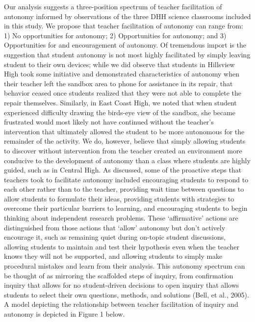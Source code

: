 \documentclass[11.5pt]{sig-alternate} %
\begin{document}
\begin{large}
Our analysis suggests a three-position spectrum of teacher facilitation of autonomy informed by observations of the three DHH science classrooms included in this study.  We propose that teacher facilitation of autonomy can range from:  1) No opportunities for autonomy; 2) Opportunities for autonomy; and 3) Opportunities for and encouragement of autonomy.   Of tremendous import is the suggestion that student autonomy is not most highly facilitated by simply leaving student to their own devices; while we did observe that students in Hillsview High took some initiative and demonstrated characteristics of autonomy when their teacher left the sandbox area to phone for assistance in its repair, that behavior ceased once students realized that they were not able to complete the repair themselves.  Similarly, in East Coast High, we noted that when student experienced difficulty drawing the birds-eye view of the sandbox, she became frustrated would most likely not have continued without the teacher’s intervention that ultimately allowed the student to be more autonomous for the remainder of the activity.  We do, however, believe that simply allowing students to discover without intervention from the teacher created an environment more conducive to the development of autonomy than a class where students are highly guided, such as in Central High.  As discussed, some of the proactive steps that teachers took to facilitate autonomy included encouraging students to respond to each other rather than to the teacher, providing wait time between questions to allow students to formulate their ideas, providing students with strategies to overcome their particular barriers to learning, and encouraging students to begin thinking about independent research problems.  These ‘affirmative’ actions are distinguished from those actions that ‘allow’ autonomy but don’t actively encourage it, such as remaining quiet during on-topic student discussions, allowing students to maintain and test their hypothesis even when the teacher knows they will not be supported, and allowing students to simply make procedural mistakes and learn from their analysis.  This autonomy spectrum can be thought of as mirroring the scaffolded steps of inquiry, from confirmation inquiry that allows for no student-driven decisions to open inquiry that allows students to select their own questions, methods, and solutions (Bell, et al., 2005).  A model depicting the relationship between teacher facilitation of inquiry and autonomy is depicted in Figure 1 below.


\end{large}
\end{document}

